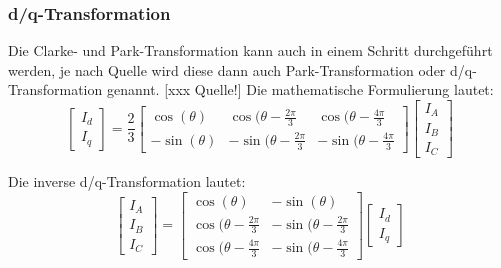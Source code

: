 \subsubsection*{d/q-Transformation} 
Die Clarke- und Park-Transformation kann auch in einem Schritt durchgeführt werden, je nach Quelle wird diese dann auch Park-Transformation oder d/q-Transformation genannt. [xxx Quelle!] 
Die mathematische Formulierung lautet:
\begin{equation}\label{dqTrafo}
\left[
	\begin{array}{c}
	I_d \\ 
	I_q
	\end{array} 
\right]
= \frac{2}{3}
\left[
	\begin{array}{ccc}
	\cos (\theta) & \cos (\theta-\frac{2\pi}{3} & \cos (\theta-\frac{4\pi}{3} \\ 
	-\sin (\theta) & -\sin (\theta-\frac{2\pi}{3} & -\sin (\theta-\frac{4\pi}{3}
	\end{array} 
\right] 
\left[
	\begin{array}{c}
	I_A \\ 
	I_B \\
	I_C
	\end{array} 
\right]
\end{equation}

Die inverse d/q-Transformation lautet:
\begin{equation}\label{invdqTrafo}
\left[
	\begin{array}{c}
	I_A \\ 
	I_B \\
	I_C
	\end{array} 
\right]
=
\left[
	\begin{array}{cc}
	\cos (\theta) & -\sin (\theta) \\
	\cos (\theta-\frac{2\pi}{3} & -\sin (\theta-\frac{2\pi}{3} \\
	\cos (\theta-\frac{4\pi}{3} & -\sin (\theta-\frac{4\pi}{3} 
	\end{array} 
\right] 
\left[
	\begin{array}{c}
	I_d \\ 
	I_q
	\end{array} 
\right]
\end{equation}


